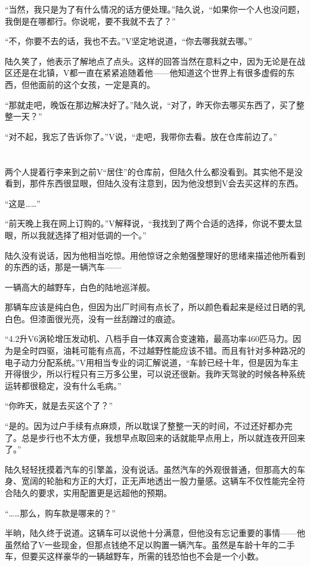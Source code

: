 “当然，我只是为了有什么情况的话方便处理。”陆久说，“如果你一个人也没问题，我倒是在哪都行。你说呢，要不我就不去了？”

“不，你要不去的话，我也不去。”V坚定地说道，“你去哪我就去哪。”

陆久笑了，他表示了解地点了点头。这样的回答当然在意料之中，因为无论是在战区还是在北镇，V都一直在紧紧追随着他——他知道这个世界上有很多虚假的东西，但他面前的这个女孩，一定是真的。

“那就走吧，晚饭在那边解决好了。”陆久说，“对了，昨天你去哪买东西了，买了整整一天？”

“对不起，我忘了告诉你了。”V说，“走吧，我带你去看。放在仓库前边了。”

\section*{}

两个人提着行李来到之前V“居住”的仓库前，但陆久什么都没看到。其实他不是没看到，那件东西很显眼，但陆久没有注意到，因为他没想到V会去买这样的东西。

“这是……”

“前天晚上我在网上订购的。”V解释说，“我找到了两个合适的选择，你说不要太显眼，所以我就选择了相对低调的一个。”

陆久没有说话，因为他相当吃惊。用他惊讶之余勉强整理好的思绪来描述他所看到的东西的话，那是一辆汽车——

一辆高大的越野车，白色的陆地巡洋舰。

那辆车应该是纯白色，但因为出厂时间有点长了，所以颜色看起来是经过日晒的乳白色。但漆面很光亮，没有一丝刮蹭过的痕迹。

“4.2升V6涡轮增压发动机、八档手自一体双离合变速箱，最高功率460匹马力。因为是全时四驱，油耗可能有点高，不过越野性能应该不错。而且有针对多种路况的电子动力分配系统。”V用相当专业的词汇解说道，“车龄已经十年，但是因为车主开得很少，所以行程只有三万多公里，可以说还很新。我昨天驾驶的时候各种系统运转都很稳定，没有什么毛病。”

“你昨天，就是去买这个了？”

“是的。因为过户手续有点麻烦，所以耽误了整整一天的时间，不过还好都办完了。总是步行也不太方便，我想早点取回来的话就能早点用上，所以就连夜开回来了。”

陆久轻轻抚摸着汽车的引擎盖，没有说话。虽然汽车的外观很普通，但那高大的车身、宽阔的轮胎和方正的大灯，正无声地透出一股力量感。这辆车不仅性能完全符合陆久的要求，实用配置更是远超他的预期。

“……那么，购车款是哪来的？”

半晌，陆久终于说道。这辆车可以说他十分满意，但他没有忘记重要的事情——他虽然给了V一些现金，但那点钱绝不足以购置一辆汽车。虽然是车龄十年的二手车，但要买这样豪华的一辆越野车，所需的钱恐怕也不会是一个小数。

